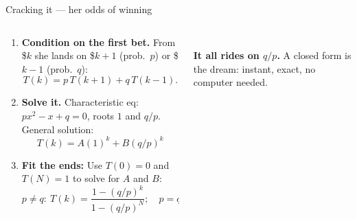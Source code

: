 \documentclass[aspectratio=169,10pt]{beamer}
\newif\ifkick \kickfalse
\newcommand{\kick}[1]{\def\thekicker{#1}\kicktrue}
\begin{document}
\begin{frame}[t]{Cracking it --- her odds of winning}
\kick{Scenario 1 \ \textbullet\ \ tactic: find a closed form}
\begin{columns}[t,onlytextwidth]
  \begin{column}{0.57\textwidth}\footnotesize
    \begin{enumerate}[<+->]\setlength\itemsep{4pt}
      \item \textbf{Condition on the first bet.} From \$$k$ she lands on \$$k{+}1$ (prob.\ $p$) or \$$k{-}1$ (prob.\ $q$):
        \[ T(k)=p\,T(k{+}1)+q\,T(k{-}1). \]
      \item \textbf{Solve it.} Characteristic eq: $px^{2}-x+q=0$, roots $1$ and $q/p$. General solution:
        \[ T(k) = A(1)^k + B(q/p)^k \]
      \item \textbf{Fit the ends:} Use $T(0)=0$ and $T(N)=1$ to solve for $A$ and $B$:
        \[ p\neq q:\ T(k)=\frac{1-(q/p)^{k}}{1-(q/p)^{N}};\quad p=q:\ T(k)=\frac{k}{N}. \]
    \end{enumerate}
  \end{column}
  \begin{column}{0.41\textwidth}
    \centering
    \\[2pt]
    {\scriptsize\textcolor{cTeal}{\textbf{It all rides on $q/p$.}} A closed form is the dream: instant, exact, no computer needed.}
  \end{column}
\end{columns}
\end{frame}
\end{document}

